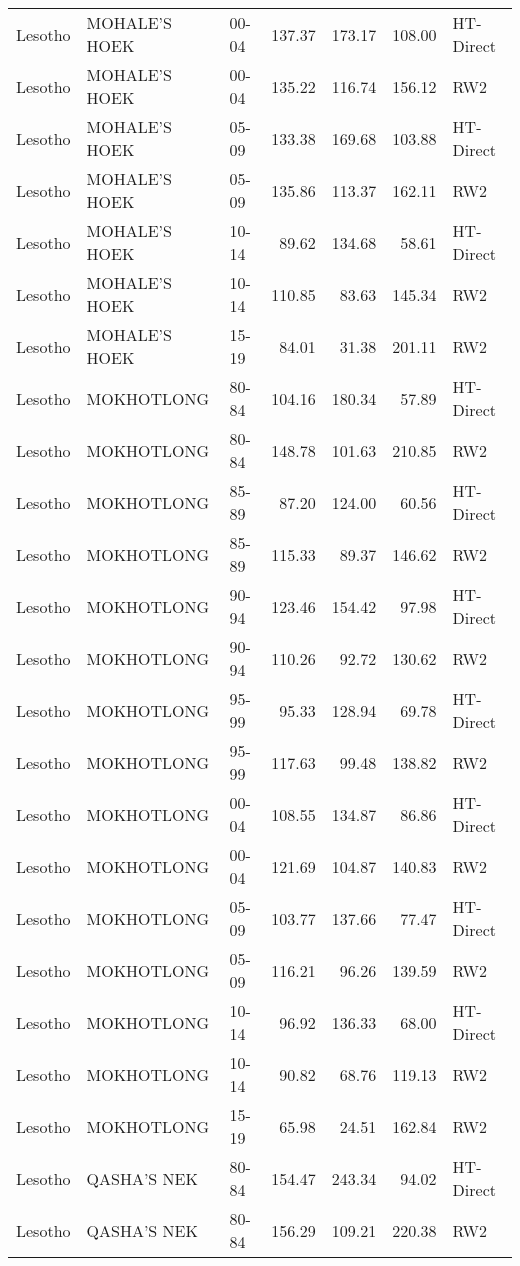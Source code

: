 \begin{longtable}{lllrrrl}
  Lesotho & MOHALE'S HOEK & 00-04 & 137.37 & 173.17 & 108.00 & HT-Direct \\ 
  Lesotho & MOHALE'S HOEK & 00-04 & 135.22 & 116.74 & 156.12 & RW2 \\ 
  Lesotho & MOHALE'S HOEK & 05-09 & 133.38 & 169.68 & 103.88 & HT-Direct \\ 
  Lesotho & MOHALE'S HOEK & 05-09 & 135.86 & 113.37 & 162.11 & RW2 \\ 
  Lesotho & MOHALE'S HOEK & 10-14 & 89.62 & 134.68 & 58.61 & HT-Direct \\ 
  Lesotho & MOHALE'S HOEK & 10-14 & 110.85 & 83.63 & 145.34 & RW2 \\ 
  Lesotho & MOHALE'S HOEK & 15-19 & 84.01 & 31.38 & 201.11 & RW2 \\ 
  Lesotho & MOKHOTLONG & 80-84 & 104.16 & 180.34 & 57.89 & HT-Direct \\ 
  Lesotho & MOKHOTLONG & 80-84 & 148.78 & 101.63 & 210.85 & RW2 \\ 
  Lesotho & MOKHOTLONG & 85-89 & 87.20 & 124.00 & 60.56 & HT-Direct \\ 
  Lesotho & MOKHOTLONG & 85-89 & 115.33 & 89.37 & 146.62 & RW2 \\ 
  Lesotho & MOKHOTLONG & 90-94 & 123.46 & 154.42 & 97.98 & HT-Direct \\ 
  Lesotho & MOKHOTLONG & 90-94 & 110.26 & 92.72 & 130.62 & RW2 \\ 
  Lesotho & MOKHOTLONG & 95-99 & 95.33 & 128.94 & 69.78 & HT-Direct \\ 
  Lesotho & MOKHOTLONG & 95-99 & 117.63 & 99.48 & 138.82 & RW2 \\ 
  Lesotho & MOKHOTLONG & 00-04 & 108.55 & 134.87 & 86.86 & HT-Direct \\ 
  Lesotho & MOKHOTLONG & 00-04 & 121.69 & 104.87 & 140.83 & RW2 \\ 
  Lesotho & MOKHOTLONG & 05-09 & 103.77 & 137.66 & 77.47 & HT-Direct \\ 
  Lesotho & MOKHOTLONG & 05-09 & 116.21 & 96.26 & 139.59 & RW2 \\ 
  Lesotho & MOKHOTLONG & 10-14 & 96.92 & 136.33 & 68.00 & HT-Direct \\ 
  Lesotho & MOKHOTLONG & 10-14 & 90.82 & 68.76 & 119.13 & RW2 \\ 
  Lesotho & MOKHOTLONG & 15-19 & 65.98 & 24.51 & 162.84 & RW2 \\ 
  Lesotho & QASHA'S NEK & 80-84 & 154.47 & 243.34 & 94.02 & HT-Direct \\ 
  Lesotho & QASHA'S NEK & 80-84 & 156.29 & 109.21 & 220.38 & RW2 \\ 

\end{longtable}
